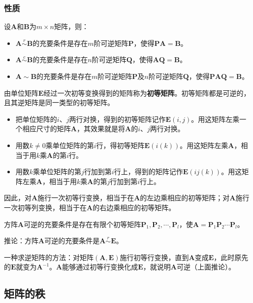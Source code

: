 \documentclass[12pt, a4paper, oneside]{ctexart}
\begin{document}
\subsubsection{性质}

设$\mathbf{A}$和$\mathbf{B}$为$m\times n$矩阵，则：
\begin{itemize}
  \item $\mathbf{A}\overset{r}{\sim}\mathbf{B}$的充要条件是存在$m$阶可逆矩阵$\mathbf{P}$，使得$\mathbf{PA}=\mathbf{B}$。
  \item $\mathbf{A}\overset{c}{\sim}\mathbf{B}$的充要条件是存在$n$阶可逆矩阵$\mathbf{Q}$，使得$\mathbf{AQ}=\mathbf{B}$。
  \item $\mathbf{A}\sim\mathbf{B}$的充要条件是存在$m$阶可逆矩阵$\mathbf{P}$及$n$阶可逆矩阵$\mathbf{Q}$，使得$\mathbf{PAQ}=\mathbf{B}$。
\end{itemize}

由单位矩阵$\mathbf{E}$经过一次初等变换得到的矩阵称为\textbf{初等矩阵}。初等矩阵都是可逆的，且其逆矩阵是同一类型的初等矩阵。
\begin{itemize}
  \item 把单位矩阵的$i$、$j$两行对换，得到的初等矩阵记作$\mathbf{E}(i,j)$。用这矩阵左乘一个相应尺寸的矩阵$\mathbf{A}$，其效果就是将$\mathbf{A}$的$i$、$j$两行对换。
  \item 用数$k\neq 0$乘单位矩阵的第$i$行，得初等矩阵$\mathbf{E}(i(k))$。用这矩阵左乘$\mathbf{A}$，相当于用$k$乘$\mathbf{A}$的第$i$行。
  \item 用数$k$乘单位矩阵的第$j$行加到第$i$行上，得到的矩阵记作$\mathbf{E}(ij(k))$。用这矩阵左乘$\mathbf{A}$，相当于用$k$乘$\mathbf{A}$的第$j$行加到第$i$行上。
\end{itemize}

因此，对$\mathbf{A}$施行一次初等行变换，相当于在$\mathbf{A}$的左边乘相应的初等矩阵；对$\mathbf{A}$施行一次初等列变换，相当于在$\mathbf{A}$的右边乘相应的初等矩阵。

方阵$\mathbf{A}$可逆的充要条件是存在有限个初等矩阵$\mathbf{P}_1,\mathbf{P}_2,\cdots,\mathbf{P}_l$，使$\mathbf{A}=\mathbf{P}_1 \mathbf{P}_2 \cdots \mathbf{P}_l$。

推论：方阵$\mathbf{A}$可逆的充要条件是$\mathbf{A}\overset{r}{\sim}\mathbf{E}$。

一种求逆矩阵的方法：对矩阵$(\mathbf{A},\mathbf{E})$施行初等行变换，直到$\mathbf{A}$变成$\mathbf{E}$，此时原先的$\mathbf{E}$就变为$\mathbf{A}^{-1}$。$\mathbf{A}$能够通过初等行变换化成$\mathbf{E}$，就说明$\mathbf{A}$可逆（上面推论）。

\subsection{矩阵的秩}
\end{document}
